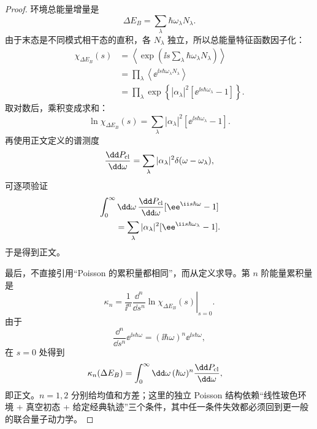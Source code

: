 \begin{proof}
环境总能量增量是
\begin{equation*}
 \Delta E_B=\sum_\lambda\hbar\omega_\lambda N_\lambda.
\end{equation*}
由于末态是不同模式相干态的直积，各 $N_\lambda$ 独立，所以总能量特征函数因子化：
\begin{align*}
 \chi_{\Delta E_B}(s)
 &=\left\langle
 \exp\!\left(\ii s\sum_\lambda\hbar\omega_\lambda N_\lambda\right)
 \right\rangle\\
 &=\prod_\lambda
 \left\langle \ee^{\ii s\hbar\omega_\lambda N_\lambda}\right\rangle\\
 &=\prod_\lambda
 \exp\!\left\{|\alpha_\lambda|^2
 [\ee^{\ii s\hbar\omega_\lambda}-1]\right\}.
\end{align*}
取对数后，乘积变成求和：
\begin{equation*}
 \ln\chi_{\Delta E_B}(s)
 =\sum_\lambda|\alpha_\lambda|^2
 [\ee^{\ii s\hbar\omega_\lambda}-1].
\end{equation*}
再使用正文定义的谱测度
\begin{equation*}
 \frac{\dd P_{\rm cl}}{\dd\omega}
 =\sum_\lambda|\alpha_\lambda|^2
 \delta(\omega-\omega_\lambda),
\end{equation*}
可逐项验证
\begin{align*}
 &\int_0^\infty\dd\omega\,
 \frac{\dd P_{\rm cl}}{\dd\omega}
 [\ee^{\ii s\hbar\omega}-1]\\
 &\qquad=\sum_\lambda|\alpha_\lambda|^2
 [\ee^{\ii s\hbar\omega_\lambda}-1].
\end{align*}
于是得到正文。

最后，不直接引用“Poisson 的累积量都相同”，而从定义求导。第 $n$ 阶能量累积量是
\begin{equation*}
 \kappa_n
 =\left.\frac1{\ii^n}
 \frac{\dd^n}{\dd s^n}
 \ln\chi_{\Delta E_B}(s)\right|_{s=0}.
\end{equation*}
由于
\begin{equation*}
 \frac{\dd^n}{\dd s^n}
 \ee^{\ii s\hbar\omega}
 =(\ii\hbar\omega)^n \ee^{\ii s\hbar\omega},
\end{equation*}
在 $s=0$ 处得到
\begin{align*}
 \kappa_n(\Delta E_B)
 &=\int_0^\infty\dd\omega\,
 (\hbar\omega)^n
 \frac{\dd P_{\rm cl}}{\dd\omega},
\end{align*}
即正文。$n=1,2$ 分别给均值和方差；这里的独立 Poisson 结构依赖“线性玻色环境 + 真空初态 + 给定经典轨迹”三个条件，其中任一条件失效都必须回到更一般的联合量子动力学。
\end{proof}

